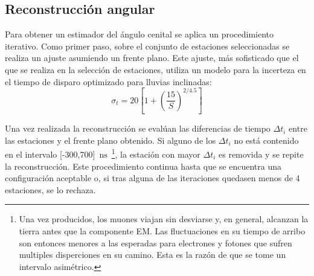 	\subsection{Reconstrucción angular}
	\label{sbsc:thetaRec}
	
	Para obtener un estimador del ángulo cenital se aplica un procedimiento iterativo.
	Como primer paso, sobre el conjunto de estaciones seleccionadas se realiza un ajuste asumiendo un frente plano.
	Este ajuste, más sofisticado que el que se realiza en la selección de estaciones, utiliza un modelo para la incerteza en el tiempo de disparo \cite{cite:ines} optimizado para lluvias inclinadas:
	\begin{equation}
	\sigma_t = 20 \left[ 1 + \left( \frac{15}{S} \right)^{2/4.5} \right]
	\label{ec:varT} 
	\end{equation}

	

	Una vez realizada la reconstrucción se evalúan las diferencias de tiempo $\Delta t_i$ entre las estaciones y el frente plano obtenido.
	Si alguno de los $\Delta t_i$ no está contenido en el intervalo [-300,700]~$\mbox{ns}$~\footnote{
	Una vez producidos, los muones viajan sin desviarse y, en general, alcanzan la tierra antes que la componente EM. 
	Las fluctuaciones en su tiempo de arribo son entonces menores a las esperadas para electrones y fotones que sufren multiples disperciones en su camino.
	Esta es la razón de que se tome un intervalo asimétrico.
	},
	la estación con mayor $\Delta t_i$ es removida y se repite la reconstrucción.
	Este procedimiento continua hasta que se encuentra una configuración aceptable o, si tras alguna de las iteraciones quedasen menos de 4 estaciones, se lo rechaza.
	
